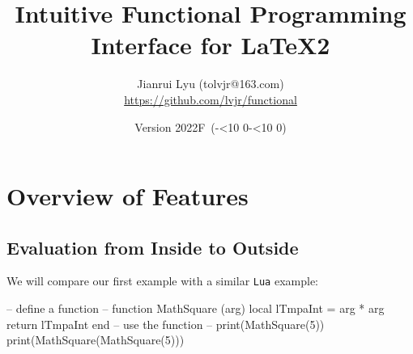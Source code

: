 \documentclass[oneside]{book}
\newcommand*{\myversion}{2022F}
\newcommand*{\mydate}{Version \myversion\ (\the\year-\mylpad\month-\mylpad\day)}
\newcommand*{\mylpad}[1]{\ifnum#1<10 0\the#1\else\the#1\fi}
\begin{document}
\title{\sffamily Intuitive \textcolor{green3}{Functional} Programming Interface for LaTeX2}
\author{Jianrui Lyu (tolvjr@163.com)\\\url{https://github.com/lvjr/functional}}
\date{\mydate\vspace{1cm}\\\myabstract\vspace{10cm}}

\newcommand\myabstract{\parbox{\linewidth}{\hrule\vspace{0.8em}\large
This package provides an intuitive functional programming interface for LaTeX2,
which is an alternative choice to \textsf{expl3} or LuaTeX,
if you want to do programming in LaTeX.
\par\vspace{0.5em}
Although there are functions in LaTeX3 programming layer (\textsf{expl3}),
the evaluation of them is from outside to inside.
With this package, the evaluation of functions is from inside to outside,
which is the same as other programming languages such as \texttt{Lua}.
In this way, it is rather easy to debug code too.
\par\vspace{0.5em}
Note that many paragraphs in this manual are copied from the documentation of \textsf{expl3}.
\par\vspace{0.8em}\hrule}}

{\let\newpage\relax\vspace{-4cm}\maketitle}

\tableofcontents

\chapter{Overview of Features}

\section{Evaluation from Inside to Outside}

We will compare our first example with a similar \verb!Lua! example:

\begin{minipage}{0.55\textwidth}
\begin{codehigh}
\IgnoreSpacesOn
\prgNewFunction {} {
  \intSet {}
  \prgReturn {\expValue \lTmpaInt}
}
\IgnoreSpacesOff
{}
\end{codehigh}
\end{minipage}%
\begin{minipage}{0.45\textwidth}
\begin{code}
-- define a function --
function MathSquare (arg)
  local lTmpaInt = arg * arg
  return lTmpaInt
end
-- use the function --
print(MathSquare(5))
print(MathSquare(MathSquare(5)))
\end{code}
\end{minipage}
\end{document}
